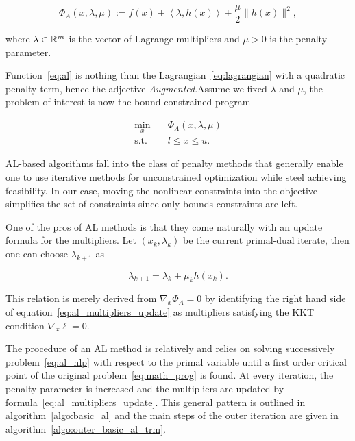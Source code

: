 \documentclass[10pt]{article}
\numberwithin{equation}{section}
\newcommand{\scal}[2]{\left\langle {#1} , {#2} \right\rangle} %
\begin{document}
	 \begin{equation}
	 	\label{eq:al}
	 	\Phi_A(x,\lambda,\mu) := f(x) + \scal{\lambda}{h(x)} + \dfrac{\mu}{2} \|h(x)\|^2,
	 \end{equation}
	 
	 where $\lambda\in {\mathbb{R}}^m$ is the vector of Lagrange multipliers and $\mu > 0$ is the penalty parameter.
	 
	 Function~\eqref{eq:al} is nothing than the Lagrangian~\eqref{eq:lagrangian} with a quadratic penalty term, hence the adjective \textit{Augmented}.Assume we fixed $\lambda$ and $\mu$, the problem of interest is now the bound constrained program
	 
	 \begin{equation}\label{eq:al_nlp}
	 	\begin{aligned}
	 		\min_x \quad & \Phi_A(x,\lambda,\mu) \\
	 		\text{s.t.} \quad & l \le x \le u.
	 	\end{aligned}
	 \end{equation}
	 
	 AL-based algorithms fall into the class of penalty methods that generally enable one to use iterative methods for unconstrained optimization  while steel achieving feasibility. In our case, moving the nonlinear constraints into the objective simplifies the set of constraints since only bounds constraints are left.
	 
	 One of the pros of AL methods is that they come naturally with an update formula for the multipliers. Let \((x_k,\lambda_k)\) be the current primal-dual iterate, then one can choose \(\lambda_{k+1} \) as
	 
	 \begin{equation}\label{eq:al_multipliers_update}
	 	\lambda_{k+1} = \lambda_k + \mu_kh(x_k).
	 \end{equation}
	 
	 This relation is merely derived from \(\nabla_x\Phi_A=0\) by identifying the right hand side of equation~\eqref{eq:al_multipliers_update} as multipliers satisfying the KKT condition \(\nabla_x \ell =0\).
	 
	 The procedure of an AL method is relatively  and relies on solving successively  problem~\eqref{eq:al_nlp} with respect to the primal variable until a first order critical point of the original problem~\eqref{eq:math_prog} is found. At every iteration, the penalty parameter is increased and the multipliers are updated by formula~\eqref{eq:al_multipliers_update}. This general pattern is outlined in algorithm~\ref{algo:basic_al} and the main steps of the outer iteration are given in  algorithm~\ref{algo:outer_basic_al_trm}.
	 
\end{document}
